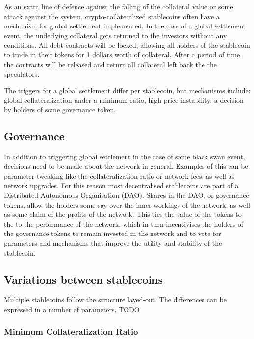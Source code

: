 \documentclass[english,]{IEEEtran}
\begin{document}
As an extra line of defence against the falling of the collateral value
or some attack against the system, crypto-collateralized stablecoins
often have a mechanism for global settlement implemented. In the case of
a global settlement event, the underlying collateral gets returned to
the investors without any conditions. All debt contracts will be locked,
allowing all holders of the stablecoin to trade in their tokens for 1
dollars worth of collateral. After a period of time, the contracts will
be released and return all collateral left back the the speculators.

The triggers for a global settlement differ per stablecoin, but
mechanisms include: global collateralization under a minimum ratio, high
price instability, a decision by holders of some governance token.

\hypertarget{governance}{%
\subsection{Governance}\label{governance}}

In addition to triggering global settlement in the case of some black
swan event, decisions need to be made about the network in general.
Examples of this can be parameter tweaking like the collateralization
ratio or network fees, as well as network upgrades. For this reason most
decentralised stablecoins are part of a Distributed Autonomous
Organisation (DAO). Shares in the DAO, or governance tokens, allow the
holders some say over the inner workings of the network, as well as some
claim of the profits of the network. This ties the value of the tokens
to the to the performance of the network, which in turn incentivises the
holders of the governance tokens to remain invested in the network and
to vote for parameters and mechanisms that improve the utility and
stability of the stablecoin.

\hypertarget{variations-between-stablecoins}{%
\subsection{Variations between
stablecoins}\label{variations-between-stablecoins}}

Multiple stablecoins follow the structure layed-out. The differences can
be expressed in a number of parameters. TODO

\hypertarget{minimum-collateralization-ratio}{%
\subsubsection{Minimum Collateralization
Ratio}\label{minimum-collateralization-ratio}}
\end{document}
